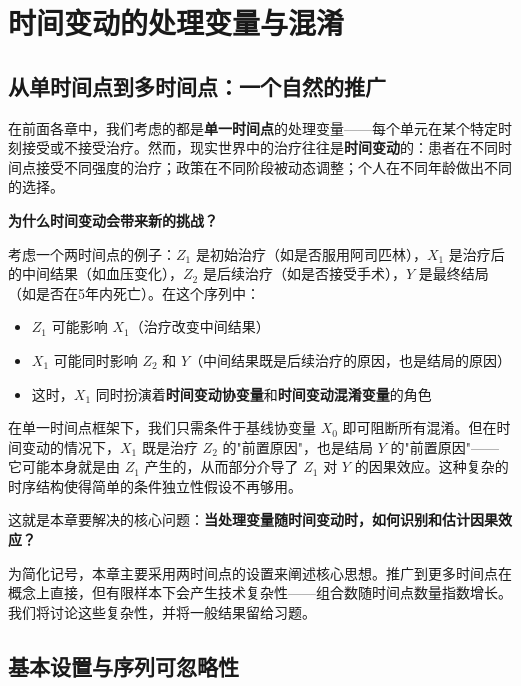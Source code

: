 
\chapter{时间变动的处理变量与混淆}\label{ch:29}

\section{从单时间点到多时间点：一个自然的推广}\label{sec:29-1}

在前面各章中，我们考虑的都是\textbf{单一时间点}的处理变量——每个单元在某个特定时刻接受或不接受治疗。然而，现实世界中的治疗往往是\textbf{时间变动}的：患者在不同时间点接受不同强度的治疗；政策在不同阶段被动态调整；个人在不同年龄做出不同的选择。

\textbf{为什么时间变动会带来新的挑战？}

考虑一个两时间点的例子：$Z_1$ 是初始治疗（如是否服用阿司匹林），$X_1$ 是治疗后的中间结果（如血压变化），$Z_2$ 是后续治疗（如是否接受手术），$Y$ 是最终结局（如是否在5年内死亡）。在这个序列中：

\begin{itemize}
  \item $Z_1$ 可能影响 $X_1$（治疗改变中间结果）
  \item $X_1$ 可能同时影响 $Z_2$ 和 $Y$（中间结果既是后续治疗的原因，也是结局的原因）
  \item 这时，$X_1$ 同时扮演着\textbf{时间变动协变量}和\textbf{时间变动混淆变量}的角色
\end{itemize}

在单一时间点框架下，我们只需条件于基线协变量 $X_0$ 即可阻断所有混淆。但在时间变动的情况下，$X_1$ 既是治疗 $Z_2$ 的"前置原因"，也是结局 $Y$ 的"前置原因"——它可能本身就是由 $Z_1$ 产生的，从而部分介导了 $Z_1$ 对 $Y$ 的因果效应。这种复杂的时序结构使得简单的条件独立性假设不再够用。

这就是本章要解决的核心问题：\textbf{当处理变量随时间变动时，如何识别和估计因果效应？}

为简化记号，本章主要采用两时间点的设置来阐述核心思想。推广到更多时间点在概念上直接，但有限样本下会产生技术复杂性——组合数随时间点数量指数增长。我们将讨论这些复杂性，并将一般结果留给习题。

\section{基本设置与序列可忽略性}\label{sec:29-2}

